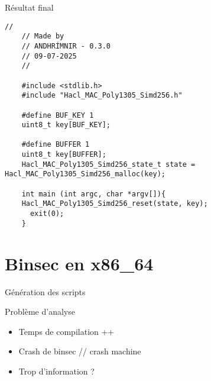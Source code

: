 \documentclass[A4,svgnames,9pt,aspectratio=169]{beamer}
\begin{document}


\begin{frame}[fragile]{Résultat final}
  \begin{lstlisting}[style=CStyle, gobble=4, caption={Hacl\_MAC\_Poly1305\_Simd256\_reset.c}]
    //
    // Made by
    // ANDHRÍMNIR - 0.3.0
    // 09-07-2025
    //

    #include <stdlib.h>
    #include "Hacl_MAC_Poly1305_Simd256.h"

    #define BUF_KEY 1
    uint8_t key[BUF_KEY];

    #define BUFFER 1
    uint8_t key[BUFFER];
    Hacl_MAC_Poly1305_Simd256_state_t state = Hacl_MAC_Poly1305_Simd256_malloc(key);

    int main (int argc, char *argv[]){
    Hacl_MAC_Poly1305_Simd256_reset(state, key);
      exit(0);
    }
  \end{lstlisting}

\end{frame}



\section{Binsec en x86\_64}
\frame{\sectionpage}

\begin{frame}{Génération des scripts}
  \begin{block}{Problème d'analyse}
    \begin{itemize}
      \item Temps de compilation ++
      \item Crash de binsec // crash machine
      \item Trop d'information ?
    \end{itemize}
  \end{block}
\end{frame}
\end{document}
